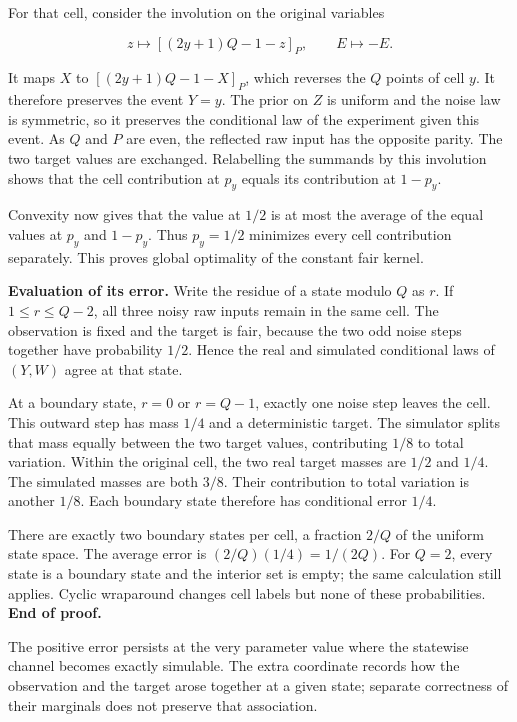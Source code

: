 \documentclass[
]{article}
\begin{document}
For that cell, consider the involution on the original variables

\[
z\longmapsto[(2y+1)Q-1-z]_P,
\qquad E\longmapsto-E.
\]

It maps \(X\) to \([(2y+1)Q-1-X]_P\), which reverses the \(Q\) points of
cell \(y\). It therefore preserves the event \(Y=y\). The prior on \(Z\)
is uniform and the noise law is symmetric, so it preserves the
conditional law of the experiment given this event. As \(Q\) and \(P\)
are even, the reflected raw input has the opposite parity. The two
target values are exchanged. Relabelling the summands by this involution
shows that the cell contribution at \(p_y\) equals its contribution at
\(1-p_y\).

Convexity now gives that the value at \(1/2\) is at most the average of
the equal values at \(p_y\) and \(1-p_y\). Thus \(p_y=1/2\) minimizes
every cell contribution separately. This proves global optimality of the
constant fair kernel.

\textbf{Evaluation of its error.} Write the residue of a state modulo
\(Q\) as \(r\). If \(1\le r\le Q-2\), all three noisy raw inputs remain
in the same cell. The observation is fixed and the target is fair,
because the two odd noise steps together have probability \(1/2\). Hence
the real and simulated conditional laws of \((Y,W)\) agree at that
state.

At a boundary state, \(r=0\) or \(r=Q-1\), exactly one noise step leaves
the cell. This outward step has mass \(1/4\) and a deterministic target.
The simulator splits that mass equally between the two target values,
contributing \(1/8\) to total variation. Within the original cell, the
two real target masses are \(1/2\) and \(1/4\). The simulated masses are
both \(3/8\). Their contribution to total variation is another \(1/8\).
Each boundary state therefore has conditional error \(1/4\).

There are exactly two boundary states per cell, a fraction \(2/Q\) of
the uniform state space. The average error is \((2/Q)(1/4)=1/(2Q)\). For
\(Q=2\), every state is a boundary state and the interior set is empty;
the same calculation still applies. Cyclic wraparound changes cell
labels but none of these probabilities. \textbf{End of proof.}

The positive error persists at the very parameter value where the
statewise channel becomes exactly simulable. The extra coordinate
records how the observation and the target arose together at a given
state; separate correctness of their marginals does not preserve that
association.
\end{document}
